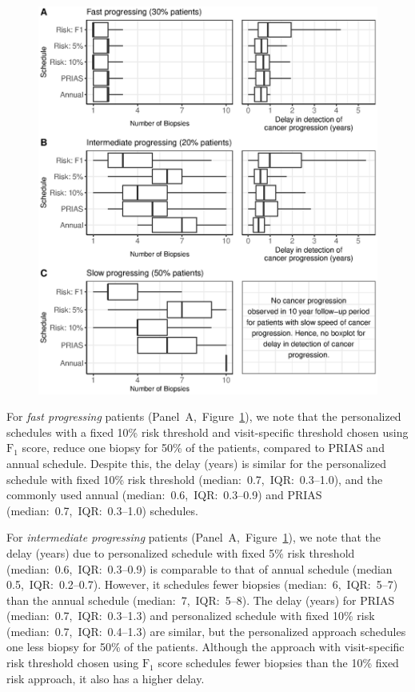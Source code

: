 \documentclass[a4paper, 12pt]{article}
\begin{document}
\begin{figure}[!htb]
\captionsetup{justification=justified}
\centerline{\includegraphics[width=\columnwidth]{Figure6.eps}}

\label{Figure6}
\end{figure}

For \textit{fast progressing} patients (Panel~A,~Figure~\ref{Figure6}), we note that the personalized schedules with a fixed 10\% risk threshold and visit-specific threshold chosen using $\mbox{F}_1$ score, reduce one biopsy for 50\% of the patients, compared to PRIAS and annual schedule. Despite this, the delay (years) is similar for the personalized schedule with fixed 10\% risk threshold (median:~0.7,~IQR:~0.3--1.0), and the commonly used annual (median:~0.6,~IQR:~0.3--0.9) and PRIAS (median:~0.7,~IQR:~0.3--1.0) schedules.

For \textit{intermediate progressing} patients (Panel~A,~Figure~\ref{Figure6}), we note that the delay (years) due to personalized schedule with fixed 5\% risk threshold (median:~0.6,~IQR:~0.3--0.9) is comparable to that of annual schedule (median 0.5,~IQR:~0.2--0.7). However, it schedules fewer biopsies (median:~6,~IQR:~5--7) than the annual schedule (median:~7,~IQR:~5--8). The delay (years) for PRIAS (median:~0.7,~IQR:~0.3--1.3) and personalized schedule with fixed 10\% risk (median:~0.7,~IQR:~0.4--1.3) are similar, but the personalized approach schedules one less biopsy for 50\% of the patients. Although the approach with visit-specific risk threshold chosen using $\mbox{F}_1$ score schedules fewer biopsies than the 10\% fixed risk approach, it also has a higher delay.
\end{document}
